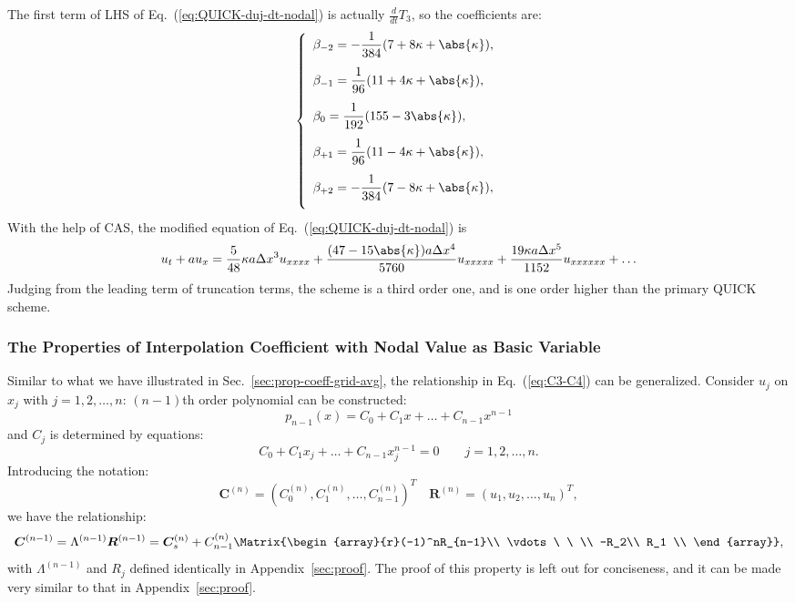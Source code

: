 \documentclass[]{article}
\begin{document}
The first term of LHS of Eq.~(\ref{eq:QUICK-duj-dt-nodal}) is actually
$\frac{d}{dt}T_3$, so the coefficients are:
\[
\left\{\begin{array}{l}
\displaystyle
\beta_{-2} = -\frac{1}{384} (7+8\kappa+\abs{\kappa}),\\[4mm]
\displaystyle
\beta_{-1} = \frac{1}{96} (11+4\kappa+\abs{\kappa}),\\[4mm]
\displaystyle
\beta_{0} = \frac{1}{192} (155-3\abs{\kappa}),\\[4mm]
\displaystyle
\beta_{+1} = \frac{1}{96} (11-4\kappa+\abs{\kappa}),\\[4mm]
\displaystyle
\beta_{+2} = -\frac{1}{384} (7-8\kappa+\abs{\kappa}),\\[4mm]
\end{array}\right.
\]
With the help of CAS, the modified equation of Eq.~(\ref{eq:QUICK-duj-dt-nodal})
is
\[
u_t+au_x=\frac{5}{48}\kappa a\Delta x^3 u_{xxxx} +
\frac{(47-15\abs{\kappa})a\Delta x^4 }{5760}u_{xxxxx} + \frac{19\kappa
  a\Delta x^5}{1152}u_{xxxxxx}+\ldots
\]
Judging from the leading term of truncation terms, the scheme is a third order
one, and is one order higher than the primary QUICK scheme.

\subsubsection{The Properties of Interpolation Coefficient with Nodal Value as Basic Variable}\label{sec:prop-coeff-nodal-value}
Similar to what we have illustrated in Sec.~\ref{sec:prop-coeff-grid-avg}, the
relationship in Eq.~(\ref{eq:C3-C4}) can be generalized. Consider $u_j$ on
$x_j$ with $j=1,2,\dots,n$: $(n-1)$th order polynomial can be constructed:
\[
p_{n-1}(x) = C_0 + C_1 x + \dots + C_{n-1} x^{n-1}
\]
and $C_j$ is determined by equations:
\[
C_0 + C_1 x_j + \dots + C_{n-1}x_j^{n-1} = 0\qquad j=1,2,\dots,n.
\]
Introducing the notation:
\[
\bm C^{(n)} = (C_0^{(n)}, C_1^{(n)}, \dots, C_{n-1}^{(n)})^T \quad
\bm R^{(n)} = (u_1, u_2, \dots, u_n)^T,
\]
we have the relationship:
\[
\bm C^{(n-1)}=\Lambda^{(n-1)}\bm R^{(n-1)}=\bm C^{(n)}_s +
C^{(n)}_{n-1}\Matrix{\begin{array}{r}(-1)^nR_{n-1}\\ \vdots\ \ \\ -R_2\\ R_1 \\
\end{array}},
\]
with $\Lambda^{(n-1)}$ and $R_j$ defined identically in
Appendix~\ref{sec:proof}. The proof of this property is left out for
conciseness, and it can be made very similar to that in
Appendix~\ref{sec:proof}.
\end{document}

